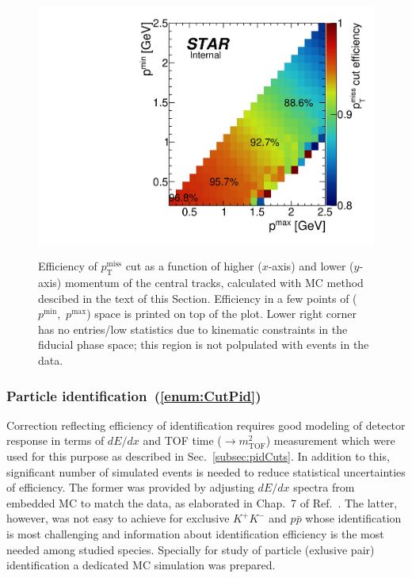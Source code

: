 \begin{figure}[h]
\centering%
\parbox{0.4725\textwidth}{%
  \centering%
  \includegraphics[width=\linewidth]{graphics/corrections/ptmisscuteff.pdf}\label{fig:ptmisscuteff}
}%
\quad%
\parbox{0.4725\textwidth}{%
    \caption[Efficiency of $p_{\text{T}}^{\text{miss}}$ cut as a function of central tracks' momenta.]{Efficiency of $p_{\text{T}}^{\text{miss}}$ cut as a function of higher ($x$-axis) and lower ($y$-axis) momentum of the central tracks, calculated with MC method descibed in the text of this Section. Efficiency in a few points of ($p^{\text{min}}$,~$p^{\text{max}}$) space is printed on top of the plot. Lower right corner has no entries/low statistics due to kinematic constraints in the fiducial phase space; this region is not polpulated with events in the data.}\label{fig:ptMissCutEff}%
}
\end{figure}


\subsubsection{Particle identification~(\ref{enum:CutPid})}\label{sec:pidEff}

Correction reflecting efficiency of identification requires good modeling of detector response in terms of $dE/dx$ and TOF time ($\rightarrow m^{2}_{\text{TOF}}$) measurement which were used for this purpose as described in Sec.~\ref{subsec:pidCuts}. In addition to this, significant number of simulated events is needed to reduce statistical uncertainties of efficiency. The former was provided by adjusting $dE/dx$ spectra from embedded MC to match the data, as elaborated in Chap.~7 of Ref.~\cite{supplementaryNote}. The latter, however, was not easy to achieve for exclusive $K^{+}K^{-}$ and $p\bar{p}$ whose identification is most challenging and information about identification efficiency is the most needed among studied species. Specially for study of particle (exlusive pair) identification a dedicated MC simulation was prepared.


